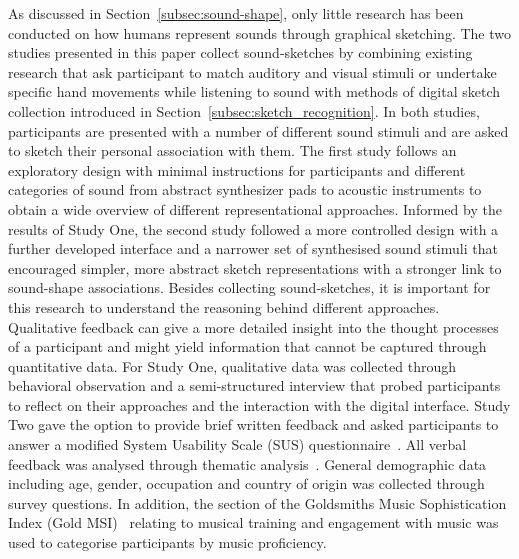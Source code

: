 \documentclass[]{interact}
\theoremstyle{plain}%
\theoremstyle{definition}
\theoremstyle{remark}
\begin{document}
As discussed in Section~\ref{subsec:sound-shape}, only little research has been conducted on how humans represent sounds through graphical sketching. The two studies presented in this paper collect sound-sketches by combining existing research that ask participant to match auditory and visual stimuli or undertake specific hand movements while listening to sound with methods of digital sketch collection introduced in Section~\ref{subsec:sketch_recognition}. In both studies, participants are presented with a number of different sound stimuli and are asked to sketch their personal association with them. The first study follows an exploratory design with minimal instructions for participants and different categories of sound from abstract synthesizer pads to acoustic instruments to obtain a wide overview of different representational approaches. Informed by the results of Study One, the second study followed a more controlled design with a further developed interface and a narrower set of synthesised sound stimuli that encouraged simpler, more abstract sketch representations with a stronger link to sound-shape associations. Besides collecting sound-sketches, it is important for this research to understand the reasoning behind different approaches. Qualitative feedback can give a more detailed insight into the thought processes of a participant and might yield information that cannot be captured through quantitative data. For Study One, qualitative data was collected through behavioral observation and a semi-structured interview that probed participants to reflect on their approaches and the interaction with the digital interface. Study Two gave the option to provide brief written feedback and asked participants to answer a modified System Usability Scale (SUS) questionnaire~\cite{lewisSystemUsabilityScale2018}. All verbal feedback was analysed through thematic analysis~\cite{braunUsingThematicAnalysis2006,stuckeySecondStepData2015}. General demographic data including age, gender, occupation and country of origin was collected through survey questions. In addition, the section of the Goldsmiths Music Sophistication Index (Gold MSI)~\cite{mullensiefenGoldsmithsMusicalSophistication} relating to musical training and engagement with music was used to categorise participants by music proficiency.   
\end{document}
